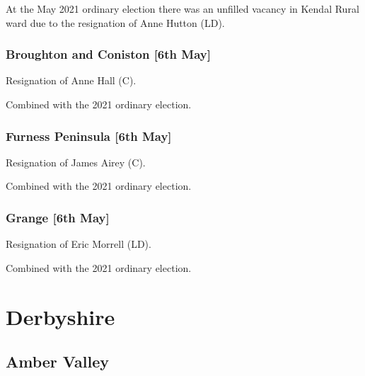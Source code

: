 \documentclass[a4paper,openany]{book}
\begin{document}
\begin{resultsiii}
At the May 2021 ordinary election there was an unfilled vacancy in Kendal Rural ward due to the resignation of Anne Hutton (LD).

\subsubsection*{Broughton and Coniston \hspace*{\fill}\nolinebreak[1]%
	\enspace\hspace*{\fill}
	[6th May]}


Resignation of Anne Hall (C).

Combined with the 2021 ordinary election.

\subsubsection*{Furness Peninsula \hspace*{\fill}\nolinebreak[1]%
	\enspace\hspace*{\fill}
	[6th May]}


Resignation of James Airey (C).

Combined with the 2021 ordinary election.

\subsubsection*{Grange \hspace*{\fill}\nolinebreak[1]%
	\enspace\hspace*{\fill}
	[6th May]}


Resignation of Eric Morrell (LD).

Combined with the 2021 ordinary election.

\section{Derbyshire}

\subsection*{Amber Valley}


\end{resultsiii}
\end{document}
